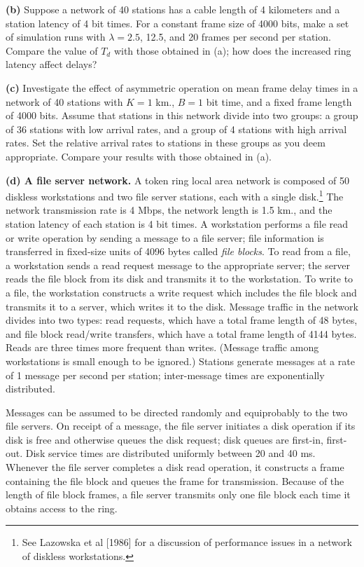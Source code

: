 \noindent\textbf{(b)} Suppose a network of 40 stations has a cable length of 4 kilometers and a station latency of 4 bit times. For a constant frame size of 4000 bits, make a set of simulation runs with $\lambda=2.5$, 12.5, and 20 frames per second per station. Compare the value of $T_d$ with those obtained in (a); how does the increased ring latency affect delays?

\noindent\textbf{(c)} Investigate the effect of asymmetric operation on mean frame delay times in a network of 40 stations with $K=1$ km., $B=1$ bit time, and a fixed frame length of 4000 bits. Assume that stations in this network divide into two groups: a group of 36 stations with low arrival rates, and a group of 4 stations with high arrival rates. Set the relative arrival rates to stations in these groups as you deem appropriate. Compare your results with those obtained in (a).

\noindent\textbf{(d) A file server network.} A token ring local area network is composed of 50 diskless workstations and two file server stations, each with a single disk.\footnote{See Lazowska et al [1986] for a discussion of performance issues in a network of diskless workstations.} The network transmission rate is 4 Mbps, the network length is 1.5 km., and the station latency of each station is 4 bit times. A workstation performs a file read or write operation by sending a message to a file server; file information is transferred in fixed-size units of 4096 bytes called \emph{file blocks}. To read from a file, a workstation sends a read request message to the appropriate server; the server reads the file block from its disk and transmits it to the workstation. To write to a file, the workstation constructs a write request which includes the file block and transmits it to a server, which writes it to the disk. Message traffic in the network divides into two types: read requests, which have a total frame length of 48 bytes, and file block read/write transfers, which have a total frame length of 4144 bytes. Reads are three times more frequent than writes. (Message traffic among workstations is small enough to be ignored.) Stations generate messages at a rate of 1 message per second per station; inter-message times are exponentially distributed.

Messages can be assumed to be directed randomly and equiprobably to the two file servers. On receipt of a message, the file server initiates a disk operation if its disk is free and otherwise queues the disk request; disk queues are first-in, first-out. Disk service times are distributed uniformly between 20 and 40 ms. Whenever the file server completes a disk read operation, it constructs a frame containing the file block and queues the frame for transmission. Because of the length of file block frames, a file server transmits only one file block each time it obtains access to the ring.

